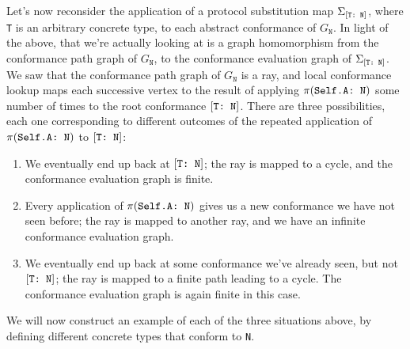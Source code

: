 \documentclass[../generics]{subfiles}
\begin{document}
Let's now reconsider the application of a protocol substitution map $\Sigma_{[\texttt{T:~N}]}$, where \texttt{T} is an arbitrary concrete type, to each abstract conformance of $G_{\texttt{N}}$. In light of the above, that we're actually looking at is a graph homomorphism from the conformance path graph of $G_{\texttt{N}}$, to the conformance evaluation graph of $\Sigma_{[\texttt{T:~N}]}$. We saw that the conformance path graph of $G_{\texttt{N}}$ is a ray, and local conformance lookup maps each successive vertex to the result of applying $\pi(\texttt{Self.A:~N})$ some number of times to the root conformance $[\texttt{T:~N}]$. There are three possibilities, each one corresponding to different outcomes of the repeated application of $\pi(\texttt{Self.A:~N})$ to $[\texttt{T:~N}]$:
\begin{enumerate}
\item We eventually end up back at $[\texttt{T:~N}]$; the ray is mapped to a cycle, and the conformance evaluation graph is finite.
\item Every application of $\pi(\texttt{Self.A:~N})$ gives us a new conformance we have not seen before; the ray is mapped to another ray, and we have an infinite conformance evaluation graph.
\item We eventually end up back at some conformance we've already seen, but not $[\texttt{T:~N}]$; the ray is mapped to a finite path leading to a cycle. The conformance evaluation graph is again finite in this case.
\end{enumerate}
We will now construct an example of each of the three situations above, by defining different concrete types that conform to \texttt{N}.
\end{document}
